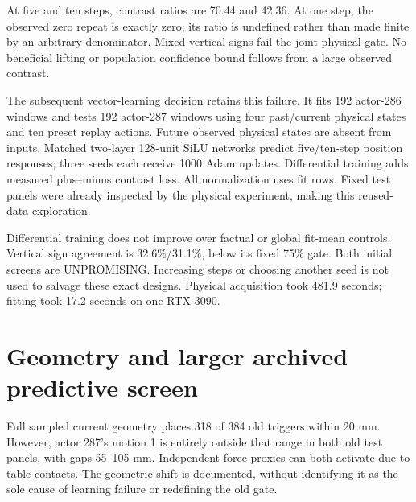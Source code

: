 \documentclass[10 pt]{article}
\begin{document}
\begin{table}[h]
\centering

\caption{Initial fixed panels: pulse versus observed zero-repeat position contrasts.}
\end{table}

At five and ten steps, contrast ratios are 70.44 and 42.36. At one step, the observed
zero repeat is exactly zero; its ratio is undefined rather than made finite by an
arbitrary denominator. Mixed vertical signs fail the joint physical gate. No beneficial
lifting or population confidence bound follows from a large observed contrast.

The subsequent vector-learning decision retains this failure. It fits 192 actor-286
windows and tests 192 actor-287 windows using four past/current physical states and
ten preset replay actions. Future observed physical states are absent from inputs.
Matched two-layer 128-unit SiLU networks predict five/ten-step position responses;
three seeds each receive 1000 Adam updates. Differential training adds measured
plus--minus contrast loss. All normalization uses fit rows. Fixed test panels were
already inspected by the physical experiment, making this reused-data exploration.

\begin{table}[h]
\centering

\caption{Actor-transfer contrast RMSE, millimeters; learned rows average three optimization seeds.}
\end{table}

Differential training does not improve over factual or global fit-mean controls.
Vertical sign agreement is 32.6\%/31.1\%, below its fixed 75\% gate. Both initial
screens are UNPROMISING. Increasing steps or choosing another seed is not used to
salvage these exact designs. Physical acquisition took 481.9 seconds; fitting took
17.2 seconds on one RTX 3090.

\section{Geometry and larger archived predictive screen}
Full sampled current geometry places 318 of 384 old triggers within 20 mm. However,
actor 287's motion 1 is entirely outside that range in both old test panels, with
gaps 55--105 mm. Independent force proxies can both activate due to table contacts.
The geometric shift is documented, without identifying it as the sole cause of
learning failure or redefining the old gate.
\end{document}
